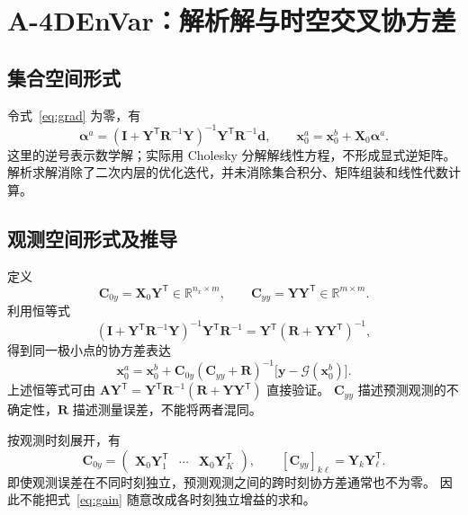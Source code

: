 \documentclass[11pt,a4paper]{article}
\newcommand{\T}{\mathsf T}
\newcommand{\R}{\mathbb R}
\newcommand{\Id}{\mathbf I}
\newcommand{\xx}{\mathbf x}
\newcommand{\yy}{\mathbf y}
\newcommand{\dd}{\mathbf d}
\newcommand{\avec}{\bm\alpha}
\begin{document}
\section{A-4DEnVar：解析解与时空交叉协方差}

\subsection{集合空间形式}

令式~\eqref{eq:grad} 为零，有
\begin{equation}
 \boxed{\avec^a=(\Id+\mathbf Y^\T\mathbf R^{-1}\mathbf Y)^{-1}
 \mathbf Y^\T\mathbf R^{-1}\dd,\qquad
 \xx_0^a=\xx_0^b+\mathbf X_0\avec^a.}
 \label{eq:analytical}
\end{equation}
这里的逆号表示数学解；实际用 Cholesky 分解解线性方程，不形成显式逆矩阵。
解析求解消除了二次内层的优化迭代，并未消除集合积分、矩阵组装和线性代数计算。

\subsection{观测空间形式及推导}

定义
\begin{equation}
 \mathbf C_{0y}=\mathbf X_0\mathbf Y^\T\in\R^{n_x\times m},\qquad
 \mathbf C_{yy}=\mathbf Y\mathbf Y^\T\in\R^{m\times m}.
 \label{eq:covs}
\end{equation}
利用恒等式
\begin{equation}
 (\Id+\mathbf Y^\T\mathbf R^{-1}\mathbf Y)^{-1}\mathbf Y^\T\mathbf R^{-1}
 =\mathbf Y^\T(\mathbf R+\mathbf Y\mathbf Y^\T)^{-1},
\end{equation}
得到同一极小点的协方差表达
\begin{equation}
 \boxed{\xx_0^a=\xx_0^b+
 \mathbf C_{0y}(\mathbf C_{yy}+\mathbf R)^{-1}
 \bigl[\yy-\mathcal G(\xx_0^b)\bigr].}
 \label{eq:gain}
\end{equation}
上述恒等式可由
$\mathbf A\mathbf Y^\T=\mathbf Y^\T\mathbf R^{-1}(\mathbf R+\mathbf Y\mathbf Y^\T)$
直接验证。
$\mathbf C_{yy}$ 描述预测观测的不确定性，$\mathbf R$ 描述测量误差，不能将两者混同。

按观测时刻展开，有
\begin{equation}
 \mathbf C_{0y}=\begin{pmatrix}\mathbf X_0\mathbf Y_1^\T&\cdots&
 \mathbf X_0\mathbf Y_K^\T\end{pmatrix},\qquad
 [\mathbf C_{yy}]_{k\ell}=\mathbf Y_k\mathbf Y_\ell^\T.
 \label{eq:blocks}
\end{equation}
即使观测误差在不同时刻独立，预测观测之间的跨时刻协方差通常也不为零。
因此不能把式~\eqref{eq:gain} 随意改成各时刻独立增益的求和。
\end{document}
